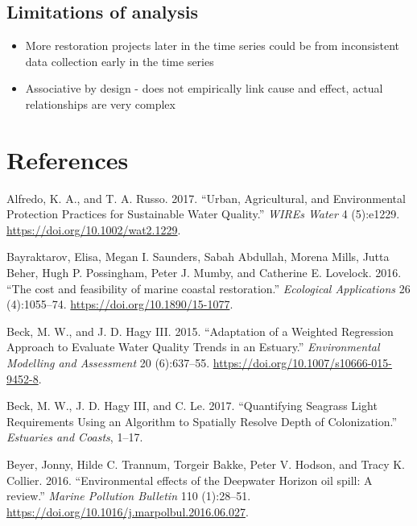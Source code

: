 \documentclass[]{article}
\begin{document}
\hypertarget{limitations-of-analysis}{%
\subsection{Limitations of analysis}\label{limitations-of-analysis}}

\begin{itemize}
\item
  More restoration projects later in the time series could be from
  inconsistent data collection early in the time series
\item
  Associative by design - does not empirically link cause and effect,
  actual relationships are very complex
\end{itemize}

\hypertarget{references}{%
\section*{References}\label{references}}

\hypertarget{refs}{}
\leavevmode\hypertarget{ref-Alfredo17}{}%
Alfredo, K. A., and T. A. Russo. 2017. ``Urban, Agricultural, and
Environmental Protection Practices for Sustainable Water Quality.''
\emph{WIREs Water} 4 (5):e1229. \url{https://doi.org/10.1002/wat2.1229}.

\leavevmode\hypertarget{ref-Bayraktarov16}{}%
Bayraktarov, Elisa, Megan I. Saunders, Sabah Abdullah, Morena Mills,
Jutta Beher, Hugh P. Possingham, Peter J. Mumby, and Catherine E.
Lovelock. 2016. ``The cost and feasibility of marine coastal
restoration.'' \emph{Ecological Applications} 26 (4):1055--74.
\url{https://doi.org/10.1890/15-1077}.

\leavevmode\hypertarget{ref-Beck15}{}%
Beck, M. W., and J. D. Hagy III. 2015. ``Adaptation of a Weighted
Regression Approach to Evaluate Water Quality Trends in an Estuary.''
\emph{Environmental Modelling and Assessment} 20 (6):637--55.
\url{https://doi.org/10.1007/s10666-015-9452-8}.

\leavevmode\hypertarget{ref-Beck17c}{}%
Beck, M. W., J. D. Hagy III, and C. Le. 2017. ``Quantifying Seagrass
Light Requirements Using an Algorithm to Spatially Resolve Depth of
Colonization.'' \emph{Estuaries and Coasts}, 1--17.

\leavevmode\hypertarget{ref-Beyer16}{}%
Beyer, Jonny, Hilde C. Trannum, Torgeir Bakke, Peter V. Hodson, and
Tracy K. Collier. 2016. ``Environmental effects of the Deepwater Horizon
oil spill: A review.'' \emph{Marine Pollution Bulletin} 110 (1):28--51.
\url{https://doi.org/10.1016/j.marpolbul.2016.06.027}.
\end{document}
